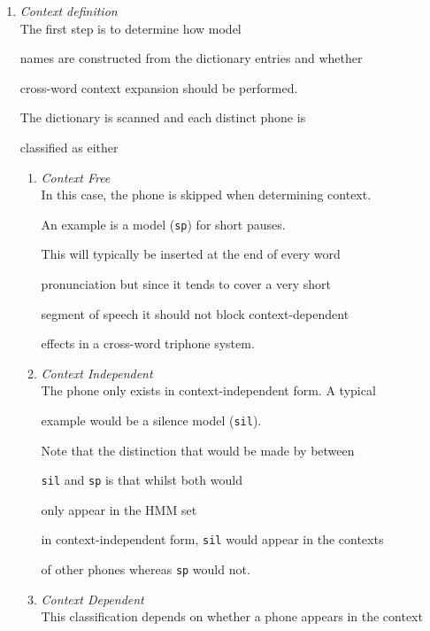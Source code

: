 \begin{enumerate}


\item \textit{Context definition} \\


The first step is to determine how model


names are constructed from the dictionary entries and whether


cross-word context expansion should be performed.


The dictionary is scanned and each distinct phone is 


classified as either


\begin{enumerate}


\item \textit{Context Free} \\


   In this case, the phone is skipped when determining context.


   An example is a model (\texttt{sp}) for short pauses.


   This will typically be inserted at the end of every word


    pronunciation but since it tends to cover a very short 


    segment of speech it should not block context-dependent


    effects in a cross-word triphone system.


\item \textit{Context Independent} \\


   The phone only exists in context-independent form.  A typical


   example would be a silence model (\texttt{sil}).


   Note that the distinction that would be made by  between


   \texttt{sil} and \texttt{sp} is that whilst both would


   only appear in the HMM set


   in context-independent form, \texttt{sil} would appear in the contexts


   of other phones whereas \texttt{sp} would not.


\item \textit{Context Dependent}  \\


        This classification depends on whether a phone appears in the context



\end{enumerate}
\end{enumerate}
